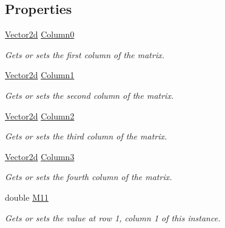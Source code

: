 \subsection*{Properties}
\begin{DoxyCompactItemize}
\item 
\hyperlink{struct_open_t_k_1_1_vector2d}{Vector2d} \hyperlink{struct_open_t_k_1_1_matrix2x4d_a0cfdd9379a9b38530ba1f55462bab58c}{Column0}
\begin{DoxyCompactList}\small\item\em Gets or sets the first column of the matrix. \end{DoxyCompactList}\item 
\hyperlink{struct_open_t_k_1_1_vector2d}{Vector2d} \hyperlink{struct_open_t_k_1_1_matrix2x4d_aaaf480494a8e6c10c6cdff9b780a5626}{Column1}
\begin{DoxyCompactList}\small\item\em Gets or sets the second column of the matrix. \end{DoxyCompactList}\item 
\hyperlink{struct_open_t_k_1_1_vector2d}{Vector2d} \hyperlink{struct_open_t_k_1_1_matrix2x4d_afd2f0b4b60359c0acf03fbbe617743f7}{Column2}
\begin{DoxyCompactList}\small\item\em Gets or sets the third column of the matrix. \end{DoxyCompactList}\item 
\hyperlink{struct_open_t_k_1_1_vector2d}{Vector2d} \hyperlink{struct_open_t_k_1_1_matrix2x4d_a87200a84b40816d6d53a2414ef4644c4}{Column3}
\begin{DoxyCompactList}\small\item\em Gets or sets the fourth column of the matrix. \end{DoxyCompactList}\item 
double \hyperlink{struct_open_t_k_1_1_matrix2x4d_a842d3ccd934f5b1e45fd03bde8a1766c}{M11}
\begin{DoxyCompactList}\small\item\em Gets or sets the value at row 1, column 1 of this instance. \end{DoxyCompactList}\item 

\end{DoxyCompactItemize}
